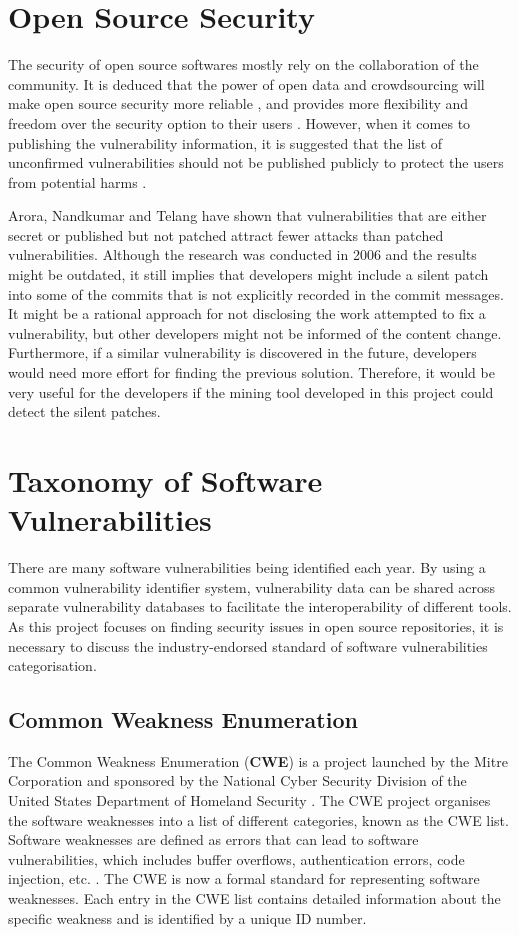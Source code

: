 \documentclass[12pt, a4paper]{report}
\begin{document}
\section{Open Source Security}
The security of open source softwares mostly rely on the collaboration of the community. It is
deduced that the power of open data and crowdsourcing will make open source security more reliable
\cite{hoepman_2007, witten_2001}, and provides more flexibility and freedom over the security option
to their users \cite{payne_2002}. However, when it comes to publishing the vulnerability
information, it is suggested that the list of unconfirmed vulnerabilities should not be published
publicly to protect the users from potential harms \cite{schryen_2011}.

Arora, Nandkumar and Telang \cite{arora_2006} have shown that vulnerabilities that are either secret
or published but not patched attract fewer attacks than patched vulnerabilities. Although the
research was conducted in 2006 and the results might be outdated, it still implies that developers
might include a silent patch into some of the commits that is not explicitly recorded in the commit
messages. It might be a rational approach for not disclosing the work attempted to fix a
vulnerability, but other developers might not be informed of the content change. Furthermore, if a
similar vulnerability is discovered in the future, developers would need more effort for finding the
previous solution. Therefore, it would be very useful for the developers if the mining tool
developed in this project could detect the silent patches.

\section{Taxonomy of Software Vulnerabilities}
There are many software vulnerabilities being identified each year. By using a common vulnerability
identifier system, vulnerability data can be shared across separate vulnerability databases to
facilitate the interoperability of different tools. As this project focuses on finding security
issues in open source repositories, it is necessary to discuss the industry-endorsed standard of
software vulnerabilities categorisation.

\subsection{Common Weakness Enumeration}
The Common Weakness Enumeration (\textbf{CWE}) is a project launched by the Mitre Corporation and
sponsored by the National Cyber Security Division of the United States Department of Homeland
Security \cite{cwe}. The CWE project organises the software weaknesses into a list of different
categories, known as the CWE list. Software weaknesses are defined as errors that can lead to
software vulnerabilities, which includes buffer overflows, authentication errors, code injection,
etc. \cite{cwe_faq}. The CWE is now a formal standard for representing software weaknesses. Each
entry in the CWE list contains detailed information about the specific weakness and is identified by
a unique ID number.
\end{document}
